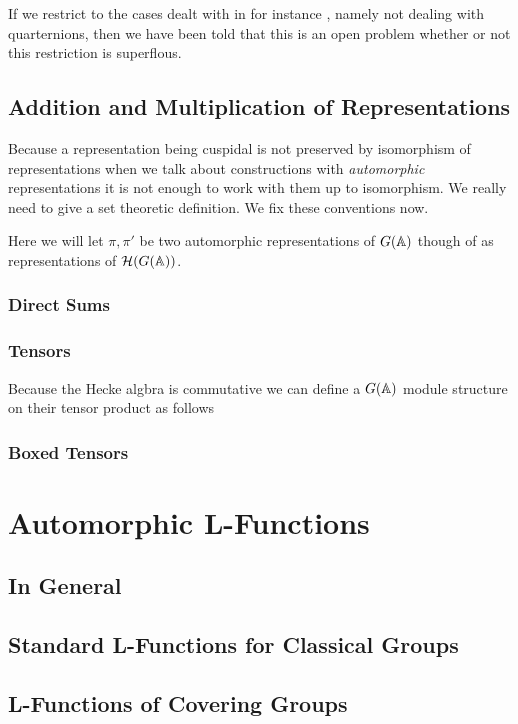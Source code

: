 If we restrict to the cases dealt with in for instance \cite{moeglinSpectralDecompositionEisenstein1995}, namely not dealing with quarternions, then we have been told that this is an open problem whether or not this restriction is superflous. 


\subsection{Addition and Multiplication of Representations}
Because a representation being cuspidal is not preserved by isomorphism of representations when we talk about constructions with \textit{automorphic}  representations it is not enough to work with them up to isomorphism. We really need to give a set theoretic definition. We fix these conventions now. 

Here we will let \(\pi, \pi'\) be two automorphic representations of \(G(\A)\) though of as representations of \(\mathcal{H}(G(\A))\). 

\subsubsection{Direct Sums}

\subsubsection{Tensors}
Because the Hecke algbra is commutative  we can define a \(G(\A)\) module structure on their tensor product as follows

\subsubsection{Boxed Tensors}


\section{Automorphic L-Functions}
\subsection{In General}
\subsection{Standard L-Functions for Classical Groups}
\subsection{L-Functions of Covering Groups}
